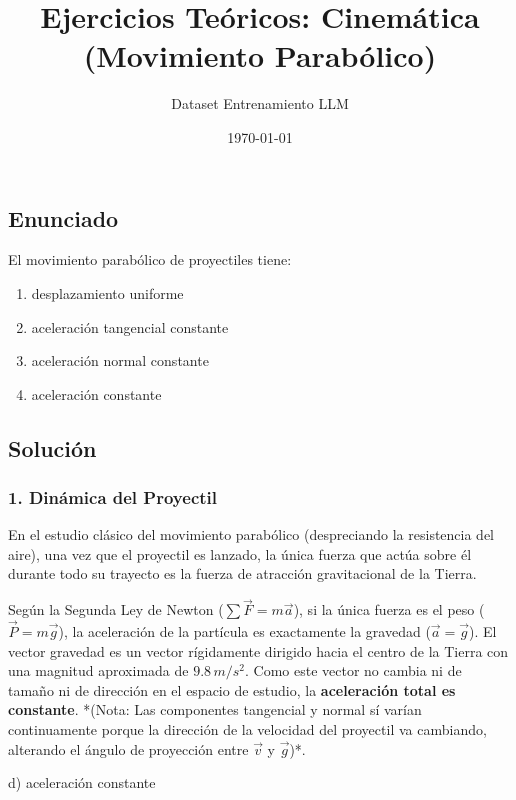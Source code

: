 \documentclass[12pt, a4paper]{article}
\title{Ejercicios Teóricos: Cinemática (Movimiento Parabólico)}
\author{Dataset Entrenamiento LLM}
\date{\today}
\begin{document}
\maketitle

\subsection*{Enunciado}
El movimiento parabólico de proyectiles tiene:
\begin{enumerate}[label=\alph*)]
    \item desplazamiento uniforme
    \item aceleración tangencial constante
    \item aceleración normal constante
    \item aceleración constante
\end{enumerate}

\subsection*{Solución}

\subsubsection*{1. Dinámica del Proyectil}
En el estudio clásico del movimiento parabólico (despreciando la resistencia del aire), una vez que el proyectil es lanzado, la única fuerza que actúa sobre él durante todo su trayecto es la fuerza de atracción gravitacional de la Tierra.

Según la Segunda Ley de Newton ($\sum \vec{F} = m\vec{a}$), si la única fuerza es el peso ($\vec{P} = m\vec{g}$), la aceleración de la partícula es exactamente la gravedad ($\vec{a} = \vec{g}$). 
El vector gravedad es un vector rígidamente dirigido hacia el centro de la Tierra con una magnitud aproximada de $9.8\,\si{m/s^2}$. Como este vector no cambia ni de tamaño ni de dirección en el espacio de estudio, la \textbf{aceleración total es constante}.
*(Nota: Las componentes tangencial y normal sí varían continuamente porque la dirección de la velocidad del proyectil va cambiando, alterando el ángulo de proyección entre $\vec{v}$ y $\vec{g}$)*.

\begin{tcolorbox}[colback=green!5!white, colframe=green!50!black, title=Respuesta Final]
\centering \Large d) aceleración constante
\end{tcolorbox}

\newpage
\end{document}
